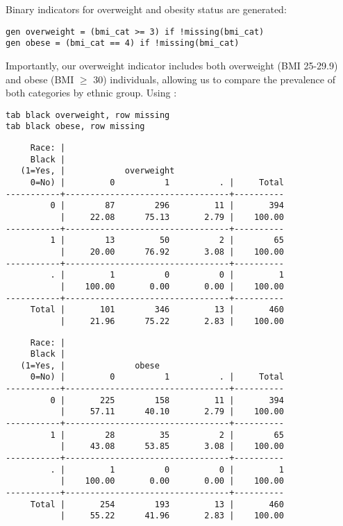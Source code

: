 Binary indicators for overweight and obesity status are generated:

\begin{verbatim}
gen overweight = (bmi_cat >= 3) if !missing(bmi_cat)
gen obese = (bmi_cat == 4) if !missing(bmi_cat)
\end{verbatim}

Importantly, our overweight indicator includes both overweight (BMI 25-29.9) and obese (BMI $\geq$ 30) individuals, allowing us to compare the prevalence of both categories by ethnic group. Using :

\begin{verbatim}
tab black overweight, row missing
tab black obese, row missing
\end{verbatim}

\begin{verbatim}
     Race: |
     Black |
   (1=Yes, |            overweight
     0=No) |         0          1          . |     Total
-----------+---------------------------------+----------
         0 |        87        296         11 |       394 
           |     22.08      75.13       2.79 |    100.00 
-----------+---------------------------------+----------
         1 |        13         50          2 |        65 
           |     20.00      76.92       3.08 |    100.00 
-----------+---------------------------------+----------
         . |         1          0          0 |         1 
           |    100.00       0.00       0.00 |    100.00 
-----------+---------------------------------+----------
     Total |       101        346         13 |       460 
           |     21.96      75.22       2.83 |    100.00 
\end{verbatim}

\begin{verbatim}
     Race: |
     Black |
   (1=Yes, |              obese
     0=No) |         0          1          . |     Total
-----------+---------------------------------+----------
         0 |       225        158         11 |       394 
           |     57.11      40.10       2.79 |    100.00 
-----------+---------------------------------+----------
         1 |        28         35          2 |        65 
           |     43.08      53.85       3.08 |    100.00 
-----------+---------------------------------+----------
         . |         1          0          0 |         1 
           |    100.00       0.00       0.00 |    100.00 
-----------+---------------------------------+----------
     Total |       254        193         13 |       460 
           |     55.22      41.96       2.83 |    100.00 
\end{verbatim}


